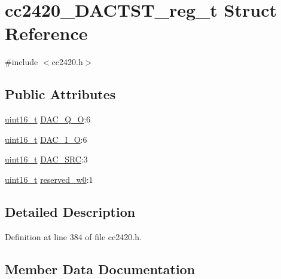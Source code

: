 \hypertarget{structcc2420___d_a_c_t_s_t__reg__t}{}\section{cc2420\+\_\+\+D\+A\+C\+T\+S\+T\+\_\+reg\+\_\+t Struct Reference}
\label{structcc2420___d_a_c_t_s_t__reg__t}


{\ttfamily \#include $<$cc2420.\+h$>$}

\subsection*{Public Attributes}
\begin{DoxyCompactItemize}
\item 
\hyperlink{_p_e___types_8h_a1f1825b69244eb3ad2c7165ddc99c956}{uint16\+\_\+t} \hyperlink{structcc2420___d_a_c_t_s_t__reg__t_aa7938cfd4a321f605e4b28320b1df793}{D\+A\+C\+\_\+\+Q\+\_\+O}\+:6
\item 
\hyperlink{_p_e___types_8h_a1f1825b69244eb3ad2c7165ddc99c956}{uint16\+\_\+t} \hyperlink{structcc2420___d_a_c_t_s_t__reg__t_a50a75379f852e13bcf540bcc6b563443}{D\+A\+C\+\_\+\+I\+\_\+O}\+:6
\item 
\hyperlink{_p_e___types_8h_a1f1825b69244eb3ad2c7165ddc99c956}{uint16\+\_\+t} \hyperlink{structcc2420___d_a_c_t_s_t__reg__t_a531765df930e387e77dcda31112ad2a2}{D\+A\+C\+\_\+\+S\+RC}\+:3
\item 
\hyperlink{_p_e___types_8h_a1f1825b69244eb3ad2c7165ddc99c956}{uint16\+\_\+t} \hyperlink{structcc2420___d_a_c_t_s_t__reg__t_a02b4cef203b6a946b4aede013168c546}{reserved\+\_\+w0}\+:1
\end{DoxyCompactItemize}


\subsection{Detailed Description}


Definition at line 384 of file cc2420.\+h.



\subsection{Member Data Documentation}
